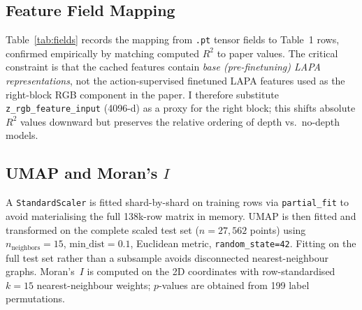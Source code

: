 \documentclass[11pt]{article}
\begin{document}
\subsection{Feature Field Mapping}

Table~\ref{tab:fields} records the mapping from \texttt{.pt} tensor fields to
Table~1 rows, confirmed empirically by matching computed $R^2$ to paper values.
The critical constraint is that the cached features contain \emph{base
(pre-finetuning) LAPA representations}, not the action-supervised finetuned
LAPA features used as the right-block RGB component in the paper.
I therefore substitute \texttt{z\_rgb\_feature\_input} (4096-d) as a proxy for
the right block; this shifts absolute $R^2$ values downward but preserves the
relative ordering of depth vs.\ no-depth models.

\begin{table}[H]
\centering
\small
\caption{Field mapping between \texttt{.pt} tensors and Table~1 rows.}
\label{tab:fields}
\renewcommand{\arraystretch}{1.2}
\end{table}

\subsection{UMAP and Moran's \texorpdfstring{$I$}{I}}

A \texttt{StandardScaler} is fitted shard-by-shard on training rows via
\texttt{partial\_fit} to avoid materialising the full 138k-row matrix in
memory.
UMAP is then fitted and transformed on the complete scaled test set
($n{=}27{,}562$ points) using $n_\text{neighbors}{=}15$,
$\text{min\_dist}{=}0.1$, Euclidean metric, \texttt{random\_state=42}.
Fitting on the full test set rather than a subsample avoids disconnected
nearest-neighbour graphs.
Moran's~$I$ is computed on the 2D coordinates with row-standardised $k{=}15$
nearest-neighbour weights; $p$-values are obtained from 199 label permutations.
\end{document}
